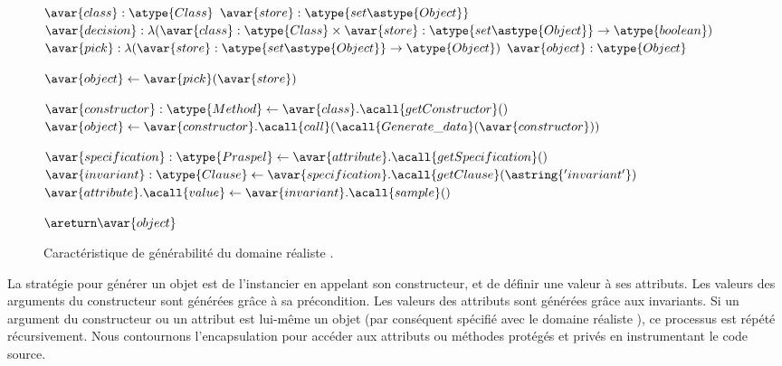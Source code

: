 \begin{figure}

\begin{center}
\begin{algorithmic}


  \Require $\avar{class}: \atype{Class}$
  \Require $\avar{store}: \atype{set\astype{Object}}$
  \Require $\avar{decision}: \lambda ( \avar{class}: \atype{Class} \times \avar{store}: \atype{set\astype{Object}} \rightarrow \atype{boolean} )$
  \Require $\avar{pick}: \lambda ( \avar{store}: \atype{set\astype{Object}} \rightarrow \atype{Object} )$
  \Ensure  $\avar{object}: \atype{Object}$


      \State $\avar{object} \gets \avar{pick}(\avar{store})$

  \Else

      \State $\avar{constructor}: \atype{Method} \gets \avar{class}.\acall{getConstructor}()$
      \State $\avar{object} \gets \avar{constructor}.\acall{call}(\acall{Generate\_data}(\avar{constructor}))$


          \State $\avar{specification}: \atype{Praspel} \gets \avar{attribute}.\acall{getSpecification}()$
          \State $\avar{invariant}: \atype{Clause} \gets \avar{specification}.\acall{getClause}(\astring{'invariant'})$
          \State $\avar{attribute}.\acall{value} \gets \avar{invariant}.\acall{sample}()$

      \EndFor

  \EndIf

  \State $\areturn \avar{object}$

\EndFunction

\end{algorithmic}
\end{center}

\caption{\label{figure:data:object} Caractéristique de générabilité du domaine
réaliste .}

\end{figure}
%
La stratégie pour générer un objet est de l'instancier en appelant son
constructeur, et de définir une valeur à ses attributs. Les valeurs des
arguments du constructeur sont générées grâce à sa précondition. Les valeurs des
attributs sont générées grâce aux invariants. Si un argument du constructeur ou
un attribut est lui-même un objet (par conséquent spécifié avec le domaine
réaliste ), ce processus est répété récursivement. Nous contournons
l'encapsulation pour accéder aux attributs ou méthodes protégés et privés en
instrumentant le code source.

